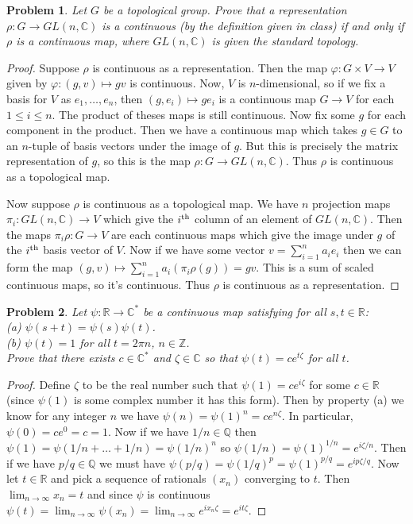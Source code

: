 \documentclass{article}
\newtheorem{problem}{Problem}
\begin{document}
\begin{problem}
Let $G$ be a topological group. Prove that a representation $\rho : G \to GL(n,\mathbb{C})$ is a continuous (by the definition given in class) if and only if $\rho$ is a continuous map, where $GL(n,\mathbb{C})$ is given the standard topology.
\end{problem}
\begin{proof}
Suppose $\rho$ is continuous as a representation. Then the map $\varphi : G \times V \to V$ given by $\varphi : (g,v) \mapsto gv$ is continuous. Now, $V$ is $n$-dimensional, so if we fix a basis for $V$ as $e_1, \dots , e_n$, then $(g,e_i) \mapsto ge_i$ is a continuous map $G \to V$ for each $1 \leq i \leq n$. The product of theses maps is still continuous. Now fix some $g$ for each component in the product. Then we have a continuous map which takes $g \in G$ to an $n$-tuple of basis vectors under the image of $g$. But this is precisely the matrix representation of $g$, so this is the map $\rho : G \to GL(n, \mathbb{C})$. Thus $\rho$ is continuous as a topological map.

Now suppose $\rho$ is continuous as a topological map. We have $n$ projection maps $\pi_i : GL(n, \mathbb{C}) \to V$ which give the $i^{\textup{th}}$ column of an element of $GL(n, \mathbb{C})$. Then the maps $\pi_i \rho : G \to V$ are each continuous maps which give the image under $g$ of the $i^{\textup{th}}$ basis vector of $V$. Now if we have some vector $v = \sum_{i=1}^n a_ie_i$ then we can form the map $(g,v) \mapsto \sum_{i=1}^n a_i (\pi_i \rho (g)) = gv$. This is a sum of scaled continuous maps, so it's continuous. Thus $\rho$ is continuous as a representation.
\end{proof}

\begin{problem}
Let $\psi : \mathbb{R} \to \mathbb{C}^*$ be a continuous map satisfying for all $s,t \in \mathbb{R}$:\\
(a) $\psi (s + t) = \psi(s) \psi(t)$.\\
(b) $\psi(t) = 1$ for all $t = 2 \pi n$, $n \in \mathbb{Z}$.\\
Prove that there exists $c \in \mathbb{C}^*$ and $\zeta \in \mathbb{C}$ so that $\psi(t) = ce^{t \zeta}$ for all $t$.
\end{problem}
\begin{proof}
Define $\zeta$ to be the real number such that $\psi(1) = ce^{i \zeta}$ for some $c \in \mathbb{R}$ (since $\psi(1)$ is some complex number it has this form). Then by property (a) we know for any integer $n$ we have $\psi(n) = \psi(1)^n = ce^{n \zeta}$. In particular, $\psi(0) = ce^0 = c = 1$. Now if we have $1/n \in \mathbb{Q}$ then $\psi(1) = \psi(1/n + \dots + 1/n) = \psi(1/n)^n$ so $\psi(1/n) = \psi(1)^{1/n} = e^{i \zeta/n}$. Then if we have $p/q \in \mathbb{Q}$ we must have $\psi(p/q) = \psi(1/q)^p = \psi(1)^{p/q} = e^{i p\zeta/q}$. Now let $t \in \mathbb{R}$ and pick a sequence of rationals $(x_n)$ converging to $t$. Then $\lim_{n \rightarrow \infty} x_n = t$ and since $\psi$ is continuous $\psi(t) = \lim_{n \rightarrow \infty} \psi(x_n) = \lim_{n \rightarrow \infty} e^{i x_n \zeta} = e^{i t \zeta}$.
\end{proof}
\end{document}

